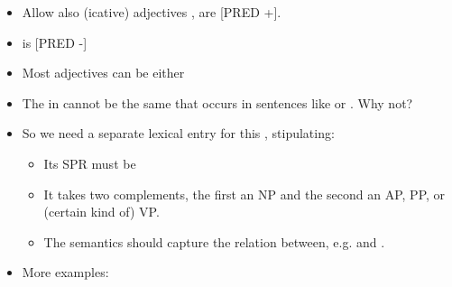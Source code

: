 \documentclass[a4paper,landscape,headrule,footrule]{foils}
\begin{document}
\vspace{-2ex}
\begin{itemize}\addtolength{\itemsep}{-2ex}
\item Allow also (icative) adjectives , 
  are  [PRED +].
\item {} is [PRED -] %
\item Most adjectives can be either  
\end{itemize}



\begin{itemize}\addtolength{\itemsep}{-1ex}
\item The  in  cannot be the 
same  that occurs in sentences like  or 
.  Why not?
\item So we need a separate lexical entry for this , 
  stipulating:
  \begin{itemize}
  \item Its SPR must be 
  \item It takes two complements, the first an NP and the 
    second an AP, PP, or (certain kind of) VP.
  \item The semantics should capture the relation between, e.g. 
     and .  
  \end{itemize}
\item More examples:
  \begin{exe}
    \ex {}
    \ex {}
    \ex {}
  \end{exe}
\end{itemize}

\end{document}
